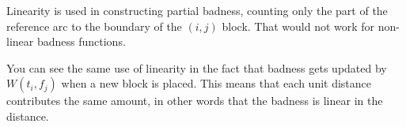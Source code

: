Linearity is used in constructing partial badness, counting only the
part of the reference arc to the boundary of the $(i,j)$ block.
That would not work for non-linear badness functions.

You can see the same use of linearity in the fact that badness gets
updated by $W(t_i,f_j)$ when a new block is placed.  This
means that each unit distance contributes the same amount, in other
words that the badness is linear in the distance.

